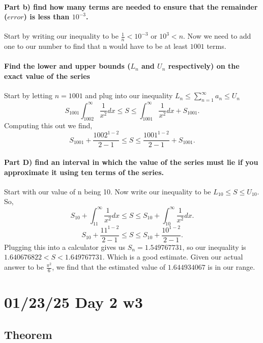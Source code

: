\paragraph{Part b) find how many terms are needed to ensure that the remainder ($ error $) is less than $ 10^{ -3 } $. \\}
Start by writing our inequality to be $ \frac{ 1 }{ n } < 10^{ -3 } $ or $ 10^{ 3 }<n $. Now we need to add one to our number to find that n would have to be at least $ 1001 $ terms. 

\paragraph{Find the lower and upper bounds ($ L_n $ and $ U_n $ respectively) on the exact value of the series\\}
Start by letting $ n=1001 $ and plug into our inequality $ L_n \le \sum_{ n=1 } ^{ \infty } a_n \le U_n$ 
\[
S_{ 1001 }\int_{ 1002 }^{ \infty } \frac{ 1 }{ x^2 } dx\le S \le \int_{ 1001 }^{ \infty } \frac{ 1 }{ x^2 } dx + S_{ 1001 }
.\] 
Computing this out we find,
\[
	S_{ 1001} + \frac{ 1002^{ 1-2 } }{ 2-1 } \le S \le \frac{ 1001^{ 1-2 } }{ 2-1 } + S_{ 1001 }
.\] 

\paragraph{Part D) find an interval in which the value of the series must lie if you approximate it using ten terms of the series. \\}
Start with our value of n being 10. Now write our inequality to be $ L_{ 10 } \le S\le U_{ 10 } $. So,
\[
S_{ 10 }+\int_{ 11 }^{ \infty } \frac{ 1 }{ x^2 } dx\le S\le S_{ 10 }+\int_{ 10 }^{ \infty } \frac{ 1 }{ x^2 } dx
.\] 
\[
S_{ 10 }+\frac{ 11^{ 1-2 } }{ 2-1 }\le S\le S_{ 10 }+ \frac{ 10^{ 1-2 } }{ 2-1 }
.\] 
Plugging this into a calculator gives us $ S_n = 1.549767731 $, so our inequality is $ 1.640676822< S < 1.649767731$. Which is a good estimate. Given our actual answer to be $ \frac{ \pi^2 }{ 6 }  $, we find that the estimated value of $ 1.644934067 $ is in our range. 
\section{01/23/25 Day 2 w3}%
\label{sec:01/23/25 Final notes on 11.3}

\subsection*{Theorem}%
\label{sub:Theorem}
